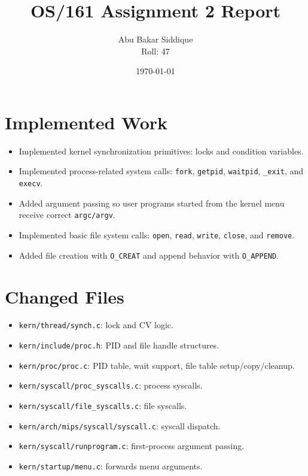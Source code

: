 \documentclass[11pt,a4paper]{article}
\title{OS/161 Assignment 2 Report}
\author{Abu Bakar Siddique\\Roll: 47}
\date{\today}
\begin{document}
\maketitle

\section{Implemented Work}

\begin{itemize}
  \item Implemented kernel synchronization primitives: locks and condition variables.
  \item Implemented process-related system calls: \texttt{fork}, \texttt{getpid}, \texttt{waitpid}, \texttt{\_exit}, and \texttt{execv}.
  \item Added argument passing so user programs started from the kernel menu receive correct \texttt{argc/argv}.
  \item Implemented basic file system calls: \texttt{open}, \texttt{read}, \texttt{write}, \texttt{close}, and \texttt{remove}.
  \item Added file creation with \texttt{O\_CREAT} and append behavior with \texttt{O\_APPEND}.
\end{itemize}

\section{Changed Files}

\begin{itemize}
  \item \texttt{kern/thread/synch.c}: lock and CV logic.
  \item \texttt{kern/include/proc.h}: PID and file handle structures.
  \item \texttt{kern/proc/proc.c}: PID table, wait support, file table setup/copy/cleanup.
  \item \texttt{kern/syscall/proc\_syscalls.c}: process syscalls.
  \item \texttt{kern/syscall/file\_syscalls.c}: file syscalls.
  \item \texttt{kern/arch/mips/syscall/syscall.c}: syscall dispatch.
  \item \texttt{kern/syscall/runprogram.c}: first-process argument passing.
  \item \texttt{kern/startup/menu.c}: forwards menu arguments.
\end{itemize}
\end{document}
